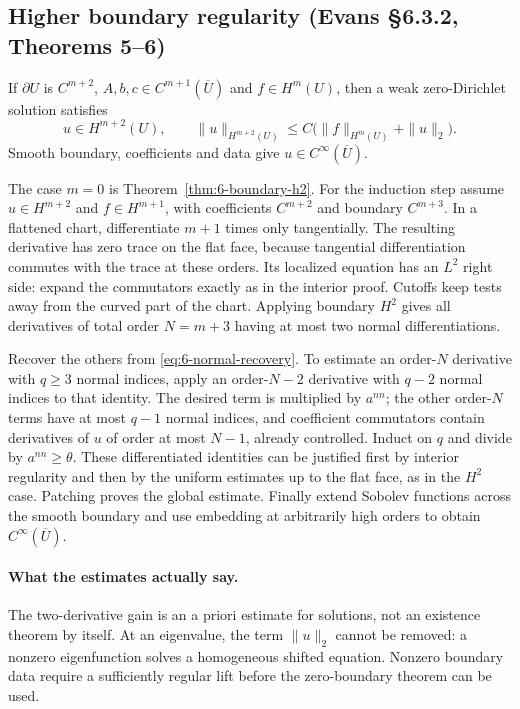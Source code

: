 \subsection{Higher boundary regularity (Evans \S6.3.2, Theorems 5--6)}
\begin{theorem}\label{thm:6-higher-boundary}
If $\partial U$ is $C^{m+2}$, $A,b,c\in C^{m+1}(\overline U)$ and
$f\in H^m(U)$, then a weak zero-Dirichlet solution satisfies
\[
 u\in H^{m+2}(U),\qquad
 \|u\|_{H^{m+2}(U)}
 \leq C\bigl(\|f\|_{H^m(U)}+\|u\|_2\bigr).
\]
Smooth boundary, coefficients and data give $u\in C^\infty(\overline U)$.
\end{theorem}
\begin{expandedproof}
The case $m=0$ is Theorem~\ref{thm:6-boundary-h2}.
For the induction step assume $u\in H^{m+2}$ and $f\in H^{m+1}$,
with coefficients $C^{m+2}$ and boundary $C^{m+3}$.
In a flattened chart, differentiate $m+1$ times only tangentially.
The resulting derivative has zero trace on the flat face, because
tangential differentiation commutes with the trace at these orders.
Its localized equation has an $L^2$ right side: expand the commutators
exactly as in the interior proof. Cutoffs keep tests away from the
curved part of the chart. Applying boundary $H^2$ gives all derivatives
of total order $N=m+3$ having at most two normal differentiations.

Recover the others from \eqref{eq:6-normal-recovery}. To estimate an
order-$N$ derivative with $q\geq3$ normal indices, apply an order-$N-2$
derivative with $q-2$ normal indices to that identity.
The desired term is multiplied by $a^{nn}$; the other order-$N$ terms
have at most $q-1$ normal indices, and coefficient commutators contain
derivatives of $u$ of order at most $N-1$, already controlled.
Induct on $q$ and divide by $a^{nn}\geq\theta$.
These differentiated identities can be justified first by interior
regularity and then by the uniform estimates up to the flat face,
as in the $H^2$ case. Patching proves the global estimate.
Finally extend Sobolev functions across the smooth boundary and use
embedding at arbitrarily high orders to obtain $C^\infty(\overline U)$.
\end{expandedproof}
\Needspace{45mm}
\paragraph{What the estimates actually say.}
The two-derivative gain is an a priori estimate for solutions, not an
existence theorem by itself. At an eigenvalue, the term $\|u\|_2$
cannot be removed: a nonzero eigenfunction solves a homogeneous
shifted equation. Nonzero boundary data require a sufficiently regular
lift before the zero-boundary theorem can be used.